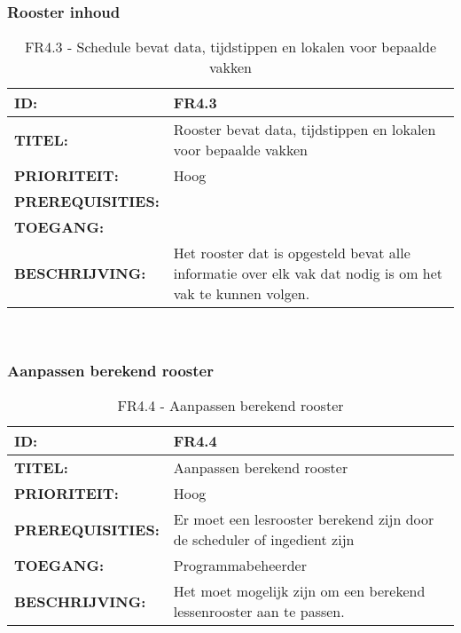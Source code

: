 \subsubsection{Rooster inhoud}        
\noindent\begin{table}[H]
	\begin{tabular}{l | p{10cm}}
	\textbf{ID:} & FR4.3 \\ \hline
	\textbf{TITEL:} & Rooster bevat data, tijdstippen en lokalen voor bepaalde vakken\\ \hline
	\textbf{PRIORITEIT:} &  Hoog \\ \hline
	\textbf{PREREQUISITIES:} & \\ \hline
	\textbf{TOEGANG:} &  \\ \hline
	\textbf{BESCHRIJVING:} & Het rooster dat is opgesteld bevat alle informatie over elk vak dat nodig is om het vak te kunnen volgen.\\
	\end{tabular}\\
	\caption{FR4.3 - Schedule bevat data, tijdstippen en lokalen voor bepaalde vakken}
	\label{tab:FR4.3 - Schedule bevat data, tijdstippen en lokalen voor bepaalde vakken}
\end{table}
       
\subsubsection{Aanpassen berekend rooster}         
\noindent\begin{table}[H]
            \begin{tabular}{l | p{10cm}}
                \textbf{ID:} & FR4.4 \\ \hline
                \textbf{TITEL:} & Aanpassen berekend rooster \\ \hline
                \textbf{PRIORITEIT:} &  Hoog \\ \hline
                \textbf{PREREQUISITIES:} & Er moet een lesrooster berekend zijn door de scheduler of ingedient zijn\\ \hline
                \textbf{TOEGANG:} & Programmabeheerder \\ \hline
                \textbf{BESCHRIJVING:} & Het moet mogelijk zijn om een berekend lessenrooster aan te passen.\\
            \end{tabular}\\
            \caption{FR4.4 - Aanpassen berekend rooster}
            \label{tab:FR4.4 - Aanpassen berekend rooster}
        \end{table}
        
